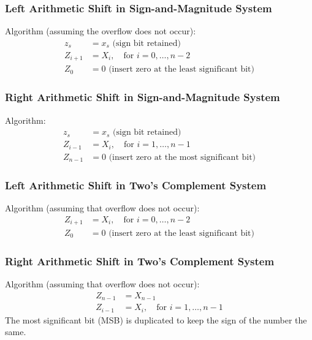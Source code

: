 \documentclass[10pt,a4paper]{book}
\begin{document}
\subsubsection{Left Arithmetic Shift in Sign-and-Magnitude System}
Algorithm (assuming the overflow does not occur):
\begin{align*}
	z_s     & = x_s \text{ (sign bit retained)}                      \\
	Z_{i+1} & = X_i, \quad \text{for } i = 0, \ldots, n-2            \\
	Z_0     & = 0 \text{ (insert zero at the least significant bit)} 
\end{align*}
	
\subsubsection{Right Arithmetic Shift in Sign-and-Magnitude System}
Algorithm:
\begin{align*}
	z_s     & = x_s \text{ (sign bit retained)}                     \\
	Z_{i-1} & = X_i, \quad \text{for } i = 1, \ldots, n - 1         \\
	Z_{n-1} & = 0 \text{ (insert zero at the most significant bit)} 
\end{align*}

\subsubsection{Left Arithmetic Shift in Two's Complement System}
Algorithm (assuming that overflow does not occur):
\begin{align*}
	Z_{i+1} & = X_{i}, \quad \text{for } i = 0, \ldots, n-2          \\
	Z_{0}   & = 0 \text{ (insert zero at the least significant bit)} 
\end{align*}

\subsubsection{Right Arithmetic Shift in Two's Complement System}
Algorithm (assuming that overflow does not occur):
\begin{align*}
	Z_{n-1} & = X_{n-1}                                   \\
	Z_{i-1} & = X_i, \quad \text{for } i = 1, \ldots, n-1 
\end{align*}
The most significant bit (MSB) is duplicated to keep the sign of the number the same.\par 
	
\end{document}
